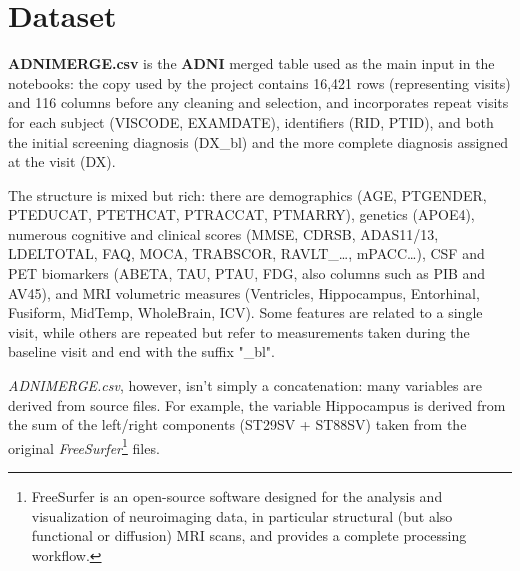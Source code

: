 \section{Dataset}
\textbf{ADNIMERGE.csv} is the \textbf{ADNI} merged table used as the main input in the notebooks: the copy used by the project contains 16,421 rows (representing visits) and 116 columns before any cleaning and selection, and incorporates repeat visits for each subject (VISCODE, EXAMDATE), identifiers (RID, PTID), and both the initial screening diagnosis (DX\_bl) and the more complete diagnosis assigned at the visit (DX).

The structure is mixed but rich: there are demographics (AGE, PTGENDER, PTEDUCAT, PTETHCAT, PTRACCAT, PTMARRY), genetics (APOE4), numerous cognitive and clinical scores (MMSE, CDRSB, ADAS11/13, LDELTOTAL, FAQ, MOCA, TRABSCOR, RAVLT\_…, mPACC…), CSF and PET biomarkers (ABETA, TAU, PTAU, FDG, also columns such as PIB and AV45), and MRI volumetric measures (Ventricles, Hippocampus, Entorhinal, Fusiform, MidTemp, WholeBrain, ICV). Some features are related to a single visit, while others are repeated but refer to measurements taken during the baseline visit and end with the suffix "\_bl".

\textit{ADNIMERGE.csv}, however, isn't simply a concatenation: many variables are derived from source files. For example, the variable Hippocampus is derived from the sum of the left/right components (ST29SV + ST88SV) taken from the original \textit{FreeSurfer}\footnote{FreeSurfer is an open-source software designed for the analysis and visualization of neuroimaging data, in particular structural (but also functional or diffusion) MRI scans, and provides a complete processing workflow.} files. 